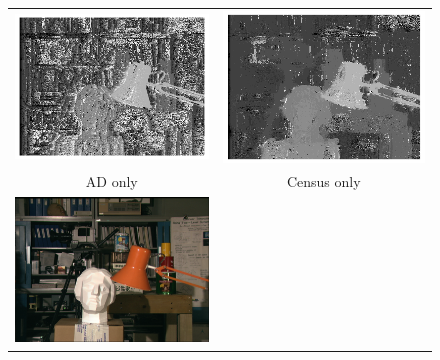 \documentclass{article}
\begin{document}
\begin{figure}[h]
\begin{center}	
\begin{tabular}{cc}
\includegraphics[scale=0.4]{Images/AD_only/disparity_map.png} &
\includegraphics[scale=0.4]{Images/Census_only/disparity_map.png}\\
AD only & Census only\\
\includegraphics[scale=0.385]{Images/tsukuba.png} &

\end{tabular}
\end{center}
\end{figure}
\end{document}
